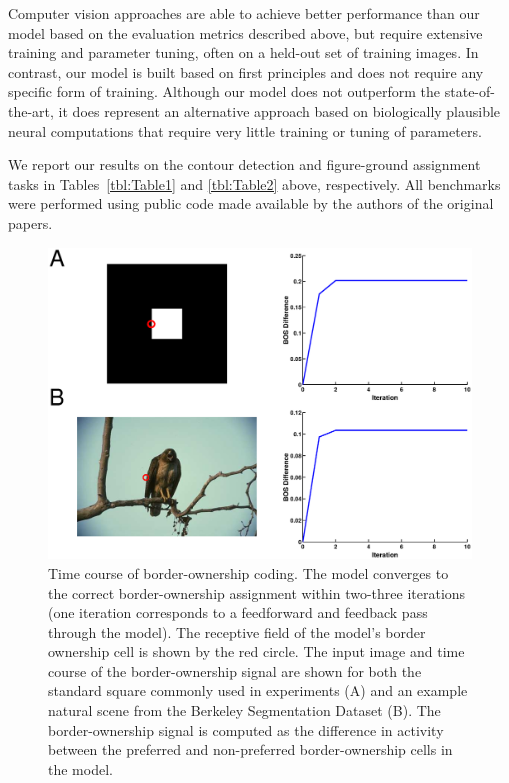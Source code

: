 Computer vision approaches are able to achieve better performance than our model based on the evaluation metrics described above, but require extensive training and parameter tuning, often on a held-out set of training images. In contrast, our model is built based on first principles and does not require any specific form of training. Although our model does not outperform the state-of-the-art, it does represent an alternative approach based on biologically plausible neural computations that require very little training or tuning of parameters.

We report our results on the contour detection and figure-ground assignment tasks in Tables~\ref{tbl:Table1} and \ref{tbl:Table2} above, respectively. All benchmarks were performed using public code made available by the authors of the original papers.

\begin{figure}[t!]
\centering
\includegraphics[width=\textwidth]{NaturalImage/figs/BOS_timecourse.eps}
\makeatletter
\let\@currsize\normalsize
\caption[Time course of border-ownership coding]{Time course of border-ownership coding. The model converges to the correct border-ownership assignment within two-three iterations (one iteration corresponds to a feedforward and feedback pass through the model). The receptive field of the model's border ownership cell is shown by the red circle. The input image and time course of the border-ownership signal are shown for both the standard square commonly used in experiments (A) and an example natural scene from the Berkeley Segmentation Dataset (B). The border-ownership signal is computed as the difference in activity between the preferred and non-preferred border-ownership cells in the model.}
\label{Fig:results_time}
\end{figure}

